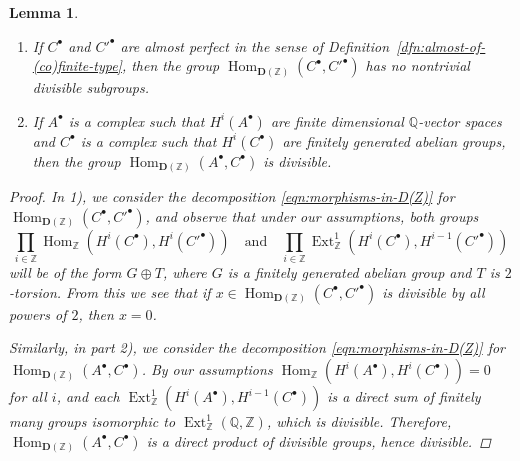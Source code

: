 \documentclass[draft,leqno,12pt]{article}
\theoremstyle{plain}
\newtheorem{lemma}[theorem]{\indent\sc Lemma}
\theoremstyle{definition}
\DeclareMathOperator{\Hom}{Hom}
\DeclareMathOperator{\Ext}{Ext}
\newcommand{\ZZ}{\mathbb{Z}}
\newcommand{\QQ}{\mathbb{Q}}
\begin{document}
\begin{lemma}
  \label{lemma:morphisms-inDAb-not-divisible}
  ~

  \begin{enumerate}
  \item[$1)$] If $C^\bullet$ and $C'^\bullet$ are almost perfect in the sense of
    Definition~{\rm\ref{dfn:almost-of-(co)finite-type}}, then the group
    $\Hom_{\mathbf{D} (\ZZ)} (C^\bullet, C'^\bullet)$ has no nontrivial
    divisible subgroups.

  \item[$2)$] If $A^\bullet$ is a complex such that $H^i (A^\bullet)$ are finite
    dimensional $\QQ$-vector spaces and $C^\bullet$ is a complex such that
    $H^i (C^\bullet)$ are finitely generated abelian groups, then the group
    $\Hom_{\mathbf{D} (\ZZ)} (A^\bullet, C^\bullet)$ is divisible.
  \end{enumerate}

  \begin{proof}
    In 1), we consider the decomposition \eqref{eqn:morphisms-in-D(Z)} for
    $\Hom_{\mathbf{D} (\ZZ)} (C^\bullet, C'^\bullet)$, and observe that under
    our assumptions, both groups
    \[ \prod_{i\in\ZZ} \Hom_\ZZ (H^i (C^\bullet), H^i (C'^\bullet))
      \quad\text{and}\quad
      \prod_{i\in\ZZ} \Ext_\ZZ^1 (H^i (C^\bullet), H^{i-1} (C'^\bullet))\]
    will be of the form $G \oplus T$, where $G$ is a finitely generated abelian
    group and $T$ is $2$-torsion. From this we see that if
    $x \in \Hom_{\mathbf{D} (\ZZ)} (C^\bullet, C'^\bullet)$ is divisible by all
    powers of $2$, then $x = 0$.

    Similarly, in part 2), we consider the decomposition
    \eqref{eqn:morphisms-in-D(Z)} for
    $\Hom_{\mathbf{D} (\ZZ)} (A^\bullet, C^\bullet)$. By our assumptions
    $\Hom_\ZZ (H^i (A^\bullet), H^i (C^\bullet)) = 0$ for all $i$, and each
    $\Ext_\ZZ^1 (H^i (A^\bullet), H^{i-1} (C^\bullet))$ is a direct sum of
    finitely many groups isomorphic to $\Ext_\ZZ^1 (\QQ,\ZZ)$, which is
    divisible. Therefore, $\Hom_{\mathbf{D} (\ZZ)} (A^\bullet, C^\bullet)$ is
    a direct product of divisible groups, hence divisible.
  \end{proof}
\end{lemma}
\end{document}
